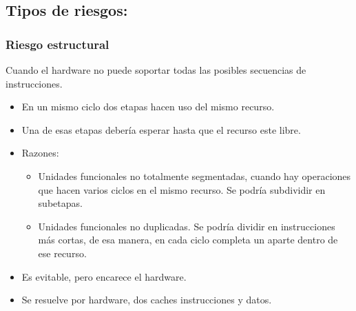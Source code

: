 \documentclass[12pt, twoside, openright]{report} %
\begin{document}
\subsection{Tipos de riesgos:}
\subsubsection{Riesgo estructural} Cuando el hardware no puede soportar todas las posibles secuencias de instrucciones.
    \begin{itemize}
      \item En un mismo ciclo dos etapas hacen uso del mismo recurso.
      \item Una de esas etapas debería esperar hasta que el recurso este libre.
      \item Razones:
          \begin{itemize}
            \item Unidades funcionales no totalmente segmentadas, cuando hay operaciones que hacen varios ciclos en el mismo recurso. Se podría subdividir en subetapas.
            \item Unidades funcionales no duplicadas. Se podría dividir en instrucciones más cortas, de esa manera, en cada ciclo completa un aparte dentro de ese recurso.
          \end{itemize}
   
      \item Es evitable, pero encarece el hardware.
      \item Se resuelve por hardware, dos caches instrucciones y datos.
    \end{itemize}
    
\end{document}
